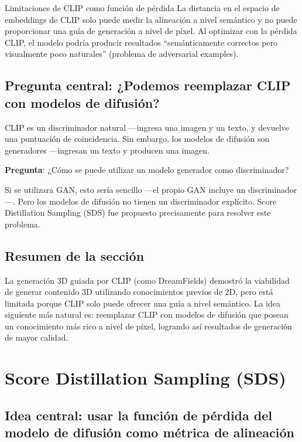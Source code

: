 \documentclass[a4paper]{article}
\begin{document}
\begin{warningbox}{Limitaciones de CLIP como función de pérdida}
La distancia en el espacio de embeddings de CLIP solo puede medir la alineación a nivel semántico y no puede proporcionar una guía de generación a nivel de píxel. Al optimizar con la pérdida CLIP, el modelo podría producir resultados ``semánticamente correctos pero visualmente poco naturales'' (problema de adversarial examples).
\end{warningbox}

\subsection{Pregunta central: ¿Podemos reemplazar CLIP con modelos de difusión?}

CLIP es un discriminador natural —ingresa una imagen y un texto, y devuelve una puntuación de coincidencia. Sin embargo, los modelos de difusión son generadores —ingresan un texto y producen una imagen.

\textbf{Pregunta}: ¿Cómo se puede utilizar un modelo generador como discriminador?

Si se utilizara GAN, esto sería sencillo —el propio GAN incluye un discriminador—. Pero los modelos de difusión no tienen un discriminador explícito. Score Distillation Sampling (SDS) fue propuesto precisamente para resolver este problema.

\subsection{Resumen de la sección}

La generación 3D guiada por CLIP (como DreamFields) demostró la viabilidad de generar contenido 3D utilizando conocimientos previos de 2D, pero está limitada porque CLIP solo puede ofrecer una guía a nivel semántico. La idea siguiente más natural es: reemplazar CLIP con modelos de difusión que posean un conocimiento más rico a nivel de píxel, logrando así resultados de generación de mayor calidad.

\newpage
\section{Score Distillation Sampling (SDS)}

\subsection{Idea central: usar la función de pérdida del modelo de difusión como métrica de alineación}
\end{document}

